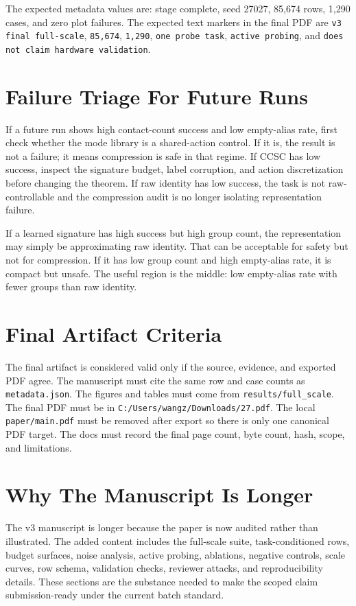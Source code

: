 \documentclass{article}
\begin{document}
The expected metadata values are: stage complete, seed 27027, 85,674 rows, 1,290 cases, and zero plot failures. The expected text markers in the final PDF are \texttt{v3 final full-scale}, \texttt{85,674}, \texttt{1,290}, \texttt{one probe task}, \texttt{active probing}, and \texttt{does not claim hardware validation}.

\section{Failure Triage For Future Runs}
If a future run shows high contact-count success and low empty-alias rate, first check whether the mode library is a shared-action control. If it is, the result is not a failure; it means compression is safe in that regime. If CCSC has low success, inspect the signature budget, label corruption, and action discretization before changing the theorem. If raw identity has low success, the task is not raw-controllable and the compression audit is no longer isolating representation failure.

If a learned signature has high success but high group count, the representation may simply be approximating raw identity. That can be acceptable for safety but not for compression. If it has low group count and high empty-alias rate, it is compact but unsafe. The useful region is the middle: low empty-alias rate with fewer groups than raw identity.

\section{Final Artifact Criteria}
The final artifact is considered valid only if the source, evidence, and exported PDF agree. The manuscript must cite the same row and case counts as \texttt{metadata.json}. The figures and tables must come from \texttt{results/full\_scale}. The final PDF must be in \texttt{C:/Users/wangz/Downloads/27.pdf}. The local \texttt{paper/main.pdf} must be removed after export so there is only one canonical PDF target. The docs must record the final page count, byte count, hash, scope, and limitations.

\section{Why The Manuscript Is Longer}
The v3 manuscript is longer because the paper is now audited rather than illustrated. The added content includes the full-scale suite, task-conditioned rows, budget surfaces, noise analysis, active probing, ablations, negative controls, scale curves, row schema, validation checks, reviewer attacks, and reproducibility details. These sections are the substance needed to make the scoped claim submission-ready under the current batch standard.
\end{document}
